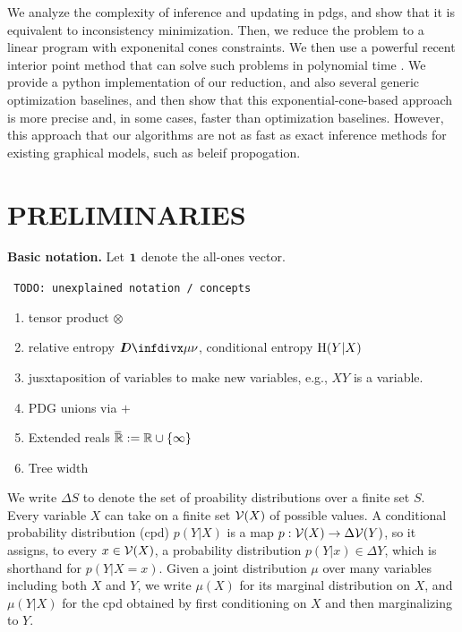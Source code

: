 \documentclass[twoside]{article}
\begin{document}
We analyze the complexity of inference and updating in pdgs, and show that it is equivalent to inconsistency minimization.
Then, we reduce the problem to a linear program with exponenital cones constraints.
We then use a powerful recent interior point method
that can solve such problems in polynomial time \parencite{dahl2022primal}. 
We provide a python implementation of our reduction, 
and also several generic optimization baselines, and then 
show that this exponential-cone-based approach is more precise
and, in some cases, faster than optimization baselines.
However, this approach that our algorithms are not as fast as exact inference methods for existing graphical models, such as beleif propogation.

\section{PRELIMINARIES}

\textbf{Basic notation.}
Let $\mathbf{1}$ denote the all-ones vector.

{\color{red}\tt
TODO: unexplained notation / concepts
\begin{enumerate}[nosep]
\raggedright
\item tensor product $\otimes$
\item relative entropy $\kldiv\mu\nu$, conditional entropy $\operatorname{\mathrm{H}}(Y|X)$
\item jusxtaposition of variables to make new variables, e.g., $XY$ is a variable.
\item PDG unions via $+$
\item Extended reals $\mskip1mu\overline{\mskip-1mu\mathbb R\!}\, := \mathbb R \cup \{\infty\}$
\item Tree width
\end{enumerate}
}


We write $\Delta S$ to denote the set of proability distributions over a finite set $S$.
Every variable $X$ can take on a finite set $\mathcal V(X)$ of possible values. 
A conditional probability distribution (cpd) $p(Y|X)$ is a map 
$p : \mathcal V(X) \to \Delta \mathcal V(Y)$, so it assigns, to every $x \in \mathcal V(X)$, a probability distribution $p(Y|x) \in \Delta Y$, which is shorthand for $p(Y|X\!\!=\!x)$.
Given a joint distribution $\mu$ over many variables including both $X$ and $Y$, 
we write $\mu(X)$ for its marginal distribution on $X$, and $\mu(Y|X)$ for the cpd obtained by first conditioning on $X$ and then marginalizing to $Y$. 
\end{document}
